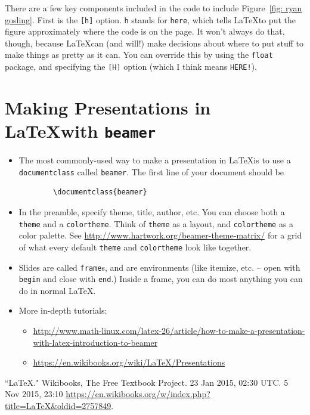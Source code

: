 \documentclass[12pt]{article}
\begin{document}
	There are a few key components included in the code to include Figure~\ref{fig: ryan gosling}. First is the \verb|[h]| option. \texttt{h} stands for \texttt{here}, which tells \LaTeX to put the figure approximately where the code is on the page. It won't always do that, though, because \LaTeX can (and will!) make decisions about where to put stuff to make things as pretty as it can. You can override this by using the \texttt{float} package, and specifying the \verb|[H]| option (which I think means \texttt{HERE!}).
	
	\section{Making Presentations in \LaTeX with \texttt{beamer}}
	\begin{itemize}
		\item The most commonly-used way to make a presentation in \LaTeX is to use a \texttt{documentclass} called \texttt{beamer}. The first line of your document should be
		\begin{verbatim}
		\documentclass{beamer}
		\end{verbatim}
		\item In the preamble, specify theme, title, author, etc. You can choose both a \texttt{theme} and a \texttt{colortheme}. Think of \texttt{theme} as a layout, and \texttt{colortheme} as a color palette. See \url{http://www.hartwork.org/beamer-theme-matrix/} for a grid of what every default \texttt{theme} and \texttt{colortheme} look like together.
		\item Slides are called \texttt{frame}s, and are environments (like itemize, etc. -- open with \texttt{begin} and close with \texttt{end}.) Inside a frame, you can do most anything you can do in normal \LaTeX.
		\item More in-depth tutorials:
		\begin{itemize}
			\item \url{http://www.math-linux.com/latex-26/article/how-to-make-a-presentation-with-latex-introduction-to-beamer}
			\item \url{https://en.wikibooks.org/wiki/LaTeX/Presentations}
		\end{itemize}
	\end{itemize}
	
	\begin{thebibliography}{99}
		 ``LaTeX." Wikibooks, The Free Textbook Project. 23 Jan 2015, 02:30 UTC. 5 Nov 2015, 23:10 \url{https://en.wikibooks.org/w/index.php?title=LaTeX&oldid=2757849}.
	\end{thebibliography}
	
\end{document}
